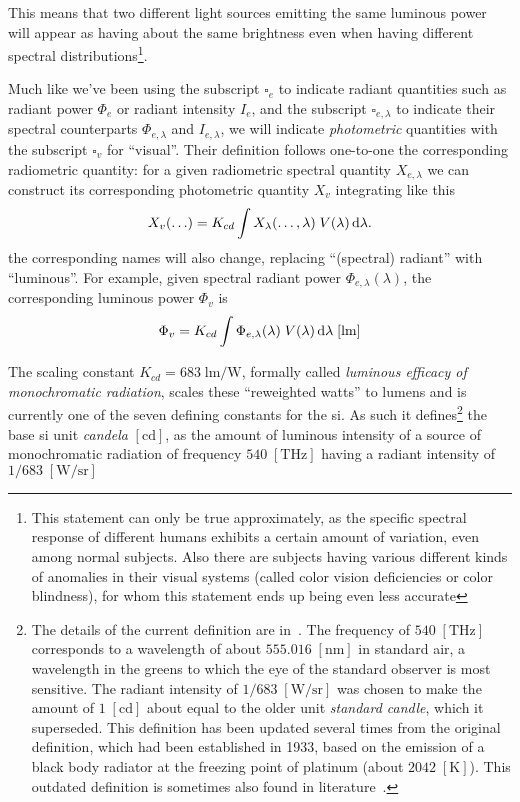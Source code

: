 This means that two different light sources emitting the same luminous
power will appear as having about the same brightness even when having
different spectral distributions\footnote{This
	statement can only be true approximately, as the specific spectral response
	of different humans exhibits a certain amount of variation, even among normal 
	subjects.
	Also there are subjects having various different kinds of anomalies in their
	visual systems (called color vision deficiencies or color blindness), 
	for whom this statement ends up being even less accurate}.

Much like we've been using the subscript $\square_e$ to indicate radiant quantities such as
radiant power $\Phi_e$ or radiant intensity $I_e$, and the subscript $\square_{e,\lambda}$ to indicate
their spectral counterparts $\Phi_{e,\lambda}$ and $I_{e,\lambda}$, we will
indicate \emph{photometric} quantities with the subscript $\square_v$ for ``visual''.
Their definition follows one-to-one the corresponding radiometric quantity: for a
given radiometric spectral quantity $X_{e,\lambda}$ we can construct its
corresponding photometric quantity $X_v$ integrating like this
\begin{equation}
	X_v(\ldots) = K_{cd} \int X_{\lambda}(\ldots,\lambda)\; V(\lambda) \mathop{}\!\mathrm{d}\lambda.
\label{eqn:rad_to_photo}
\end{equation}
the corresponding names will also change, replacing ``(spectral) radiant'' with ``luminous''.
For example, given spectral radiant power $\Phi_{e,\lambda}(\lambda)$, the
corresponding luminous power $\Phi_v$ is
\begin{displaymath}
\Phi_v = K_{cd} \int \Phi_{e,\lambda}(\lambda)\; V(\lambda) \d\lambda \;[\unit\lumen]
\end{displaymath}

The scaling constant $K_{cd} = 683\;\unit{\lumen\per\watt}$, formally called \textsl{luminous efficacy of monochromatic radiation}, 
scales these ``reweighted watts'' to lumens and is currently one of the seven defining constants 
for the \gls{si}. 
As such it defines\footnote{
	The details of the current definition are in~\cite[p. 135]{bipm:si.2019}.
	The frequency of $\num{540}\;[\unit{\tera\hertz}]$ corresponds to a wavelength of 
	about $\num{555.016}\;[\unit{\nano\meter}]$ in \gls{standard air}, a wavelength in the 
	greens to which the eye of the standard observer is most sensitive.
	The radiant intensity of $1/683\;[\unit{\watt\per\steradian}]$ was chosen to make 
	the amount of $1\;[\unit\candela]$ about equal to the older unit
	\textit{standard candle}, which it superseded. 
	This definition has been updated several times from the original definition, 
	which had been established in 1933, based on the emission of a black body radiator
	at the freezing point of platinum (about $\num{2042}\;[\unit{\kelvin}]$). 
	This outdated definition is sometimes also found in 
	literature~\cite{Meyer-Arendt:68}.
} the base \gls{si} unit \textsl{candela} $[\unit{\candela}]$, 
as the amount of luminous intensity of a source of monochromatic radiation of frequency 
$\num{540}\;[\unit{\tera\hertz}]$ having a radiant intensity of $1/683\;[\unit{\watt\per\steradian}]$


